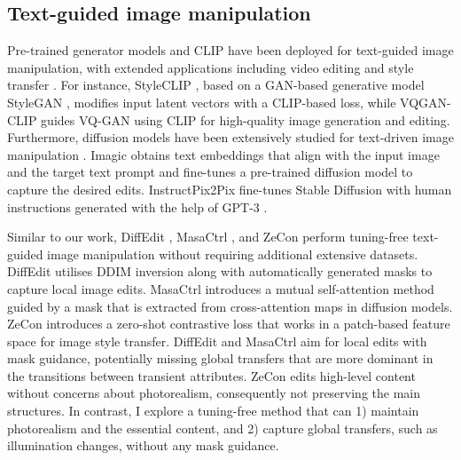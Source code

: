 \subsection{Text-guided image manipulation}
Pre-trained generator models and CLIP \cite{radford2021learning} have been deployed for text-guided image manipulation, with extended applications including video editing and style transfer \cite{bar2022text2live,gal2022stylegan,kwon2022clipstyler,liu2021fusedream,patashnik2021styleclip}. For instance, StyleCLIP \cite{patashnik2021styleclip}, based on a \gls{GAN}-based generative model StyleGAN \cite{karras2020analyzing}, modifies input latent vectors with a CLIP-based loss, while VQGAN-CLIP \cite{crowson2022vqgan} guides VQ-GAN \cite{esser2021taming} using CLIP for high-quality image generation and editing. Furthermore, diffusion models have been extensively studied for text-driven image manipulation \cite{avrahami2022blended,gal2022image,kawar2023imagic,kim2022diffusionclip,liu2023more,meng2021sdedit,nichol2021glide,ruiz2023dreambooth}. Imagic \cite{kawar2023imagic} obtains text embeddings that align with the input image and the target text prompt and fine-tunes a pre-trained diffusion model to capture the desired edits. InstructPix2Pix \cite{brooks2023instructpix2pix} fine-tunes Stable Diffusion \cite{rombach2022high} with human instructions generated with the help of GPT-3 \cite{brown2020language}.

Similar to our work, DiffEdit \cite{couairon2022diffedit}, MasaCtrl \cite{cao2023masactrl}, and ZeCon \cite{yang2023zero} perform tuning-free text-guided image manipulation without requiring additional extensive datasets. DiffEdit \cite{couairon2022diffedit} utilises DDIM inversion \cite{dhariwal2021diffusion,song2020denoising} along with automatically generated masks to capture local image edits. MasaCtrl \cite{cao2023masactrl} introduces a mutual self-attention method guided by a mask that is extracted from cross-attention maps in diffusion models. ZeCon \cite{yang2023zero} introduces a zero-shot contrastive loss that works in a patch-based feature space for image style transfer. DiffEdit \cite{couairon2022diffedit} and MasaCtrl \cite{cao2023masactrl} aim for local edits with mask guidance, potentially missing global transfers that are more dominant in the transitions between transient attributes. ZeCon \cite{yang2023zero} edits high-level content without concerns about photorealism, consequently not preserving the main structures. In contrast, I explore a tuning-free method that can 1) maintain photorealism and the essential content, and 2) capture global transfers, such as illumination changes, without any mask guidance.

